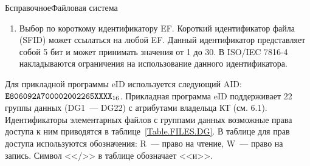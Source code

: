 \begin{appendix}{Б}{справочное}{Файловая система}
\begin{enumerate}
\item
Выбор по короткому идентификатору EF. Короткий идентификатор 
файла (SFID) может ссылаться на любой EF. Данный идентификатор 
представляет собой 5 бит и может принимать значения от 1 до 30. В ISO/IEC 
7816-4 накладываются ограничения на использование данного идентификатора. 
\end{enumerate}


Для прикладной программы eID используется следующий AID: 
$\texttt{E806092A700002002265XXXX}_{16}$. 
Прикладная программа eID поддерживает 22 группы 
данных (DG1~--- DG22) с атрибутами владельца КТ (см. 6.1). 
Идентификаторы элементарных файлов с группами данных 
возможные права доступа к ним
приводятся в таблице~\ref{Table.FILES.DG}. 
В таблице для прав доступа
используются обозначения: R~--- право на чтение, W~--- право на запись.
Символ <</>> в таблице обозначает <<и>>.
 

\end{appendix}
